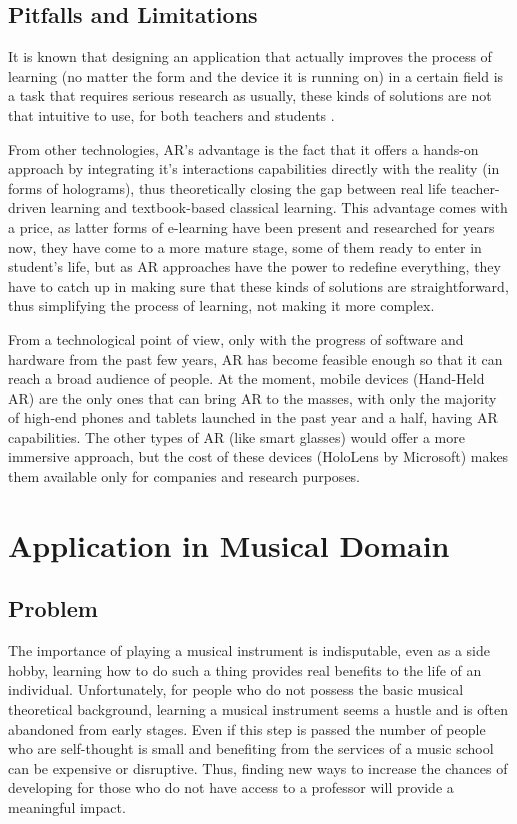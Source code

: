 \documentclass[12 pct]{report}
\begin{document}
\section{Pitfalls and Limitations}
It is known that designing an application that actually improves the process of learning (no matter the form and the device it is running on) in a certain field is a task that requires serious research as usually, these kinds of solutions are not that intuitive to use, for both teachers and students \cite{wu2013current}. 

From other technologies, AR's advantage is the fact that it offers a hands-on approach by integrating it's interactions capabilities directly \cite{akccayir2017advantages} with the reality (in forms of holograms), thus theoretically closing the gap between real life teacher-driven learning and textbook-based classical learning. This advantage comes with a price, as latter forms of e-learning have been present and researched for years now, they have come to a more mature stage, some of them ready to enter in student's life, but as AR approaches have the power to redefine everything, they have to catch up in making sure that these kinds of solutions are straightforward, thus simplifying the process of learning, not making it more complex.

From a technological point of view, only with the progress of software and hardware from the past few years, AR has become feasible enough so that it can reach a broad audience of people. At the moment, mobile devices (Hand-Held AR) are the only ones that can bring AR to the masses, with only the majority of high-end phones and tablets launched in the past year and a half, having AR capabilities. The other types of AR (like smart glasses) would offer a more immersive approach, but the cost of these devices (HoloLens \cite{kress201711} by Microsoft) makes them available only for companies and research purposes.

\chapter{Application in Musical Domain}

\section{Problem}
The importance of playing a musical instrument is indisputable, even as a side hobby, learning how to do such a thing provides real benefits to the life of an individual. Unfortunately, for people who do not possess the basic musical theoretical background, learning a musical instrument seems a hustle and is often abandoned from early stages. Even if this step is passed the number of people who are self-thought is small and benefiting from the services of a music school can be expensive or disruptive. Thus, finding new ways to increase the chances of developing for those who do not have access to a professor will provide a meaningful impact.
\end{document}
